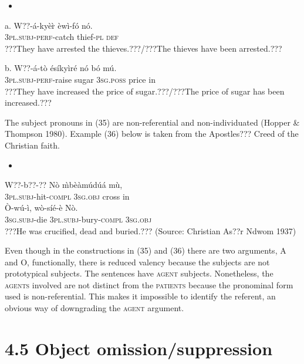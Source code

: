 \documentclass[output=paper]{langsci/langscibook}
\begin{document}
\begin{itemize}
\item \end{itemize}
\gll a.  W??-\'{a}-ky\`{e}\`{r}    \`{e}w\`{i}-f\'{o}    n\'{o}.\\
       \textsc{3pl.subj}{}-\textsc{perf}{}-catch  thief-\textsc{pl}  \textsc{def}\\
\glt ???They have arrested the thieves.???/???The thieves have been arrested.???
\z

\gll  b.  W??-\'{a}-t\`{o}    \'{e}s\'{i}ky\`{i}r\'{e}  n\'{o}    b\'{o}  m\'{u}.\\
       \textsc{3pl.subj}{}-\textsc{perf}{}-raise  sugar    \textsc{3sg.poss}  price  in\\
\glt   ???They have increased the price of sugar.???/???The price of sugar has been increased.???
\z

The subject pronouns in (35) are non-referential and non-individuated (Hopper \& Thompson 1980). Example (36) below is taken from the Apostles??? Creed of the Christian faith. 

\begin{itemize}
\item \end{itemize}
\gll W??-b??-??       N\`{o}    \`{m}b\`{e}\`{a}m\'{u}d\'{u}\'{a}  m\`{u}, \\
     \textsc{3pl.subj}{}-hit\textsc{{}-compl}  \textsc{3sg.obj}  cross    in\\
\gll \`{O}-w\'{u}-\`{i},     w\`{o}-s\'{i}\'{e}-\`{e}     N\`{o}.\\
     \textsc{3sg.subj}{}-die  \textsc{3pl.subj}{}-bury\textsc{{}-compl}  \textsc{3sg.obj}\\
\glt ???He was crucified, dead and buried.??? (Source: Christian As??r Ndwom 1937)
\z

Even though in the constructions in (35) and (36) there are two arguments, A and O, functionally, there is reduced valency because the subjects are not prototypical subjects. The sentences have \textsc{agent} subjects. Nonetheless, the \textsc{agents} involved are not distinct from the \textsc{patients} because the pronominal form used is non-referential. This makes it impossible to identify the referent, an obvious way of downgrading the \textsc{agent} argument.

\section{4.5  Object omission/suppression }
\end{document}
